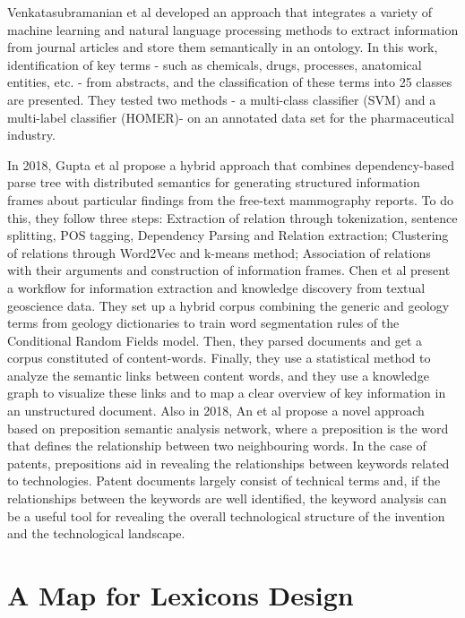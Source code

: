 \documentclass[b5paper,]{book}
\theoremstyle{definition}
\theoremstyle{definition}
\theoremstyle{definition}
\theoremstyle{remark}
\begin{document}
Venkatasubramanian et al \citep{remolona2017hybrid} developed an
approach that integrates a variety of machine learning and natural
language processing methods to extract information from journal articles
and store them semantically in an ontology. In this work, identification
of key terms - such as chemicals, drugs, processes, anatomical entities,
etc. - from abstracts, and the classification of these terms into 25
classes are presented. They tested two methods - a multi-class
classifier (SVM) and a multi-label classifier (HOMER)- on an annotated
data set for the pharmaceutical industry.

In 2018, Gupta et al \citep{gupta2018automatic} propose a hybrid
approach that combines dependency-based parse tree with distributed
semantics for generating structured information frames about particular
findings from the free-text mammography reports. To do this, they follow
three steps: Extraction of relation through tokenization, sentence
splitting, POS tagging, Dependency Parsing and Relation extraction;
Clustering of relations through Word2Vec and k-means method; Association
of relations with their arguments and construction of information
frames. Chen et al \citep{wang2018information} present a workflow for
information extraction and knowledge discovery from textual geoscience
data. They set up a hybrid corpus combining the generic and geology
terms from geology dictionaries to train word segmentation rules of the
Conditional Random Fields model. Then, they parsed documents and get a
corpus constituted of content-words. Finally, they use a statistical
method to analyze the semantic links between content words, and they use
a knowledge graph to visualize these links and to map a clear overview
of key information in an unstructured document. Also in 2018, An et al
\citep{an2018deriving} propose a novel approach based on preposition
semantic analysis network, where a preposition is the word that defines
the relationship between two neighbouring words. In the case of patents,
prepositions aid in revealing the relationships between keywords related
to technologies. Patent documents largely consist of technical terms
and, if the relationships between the keywords are well identified, the
keyword analysis can be a useful tool for revealing the overall
technological structure of the invention and the technological
landscape.

\section{A Map for Lexicons Design}\label{a-map-for-lexicons-design}
\end{document}

